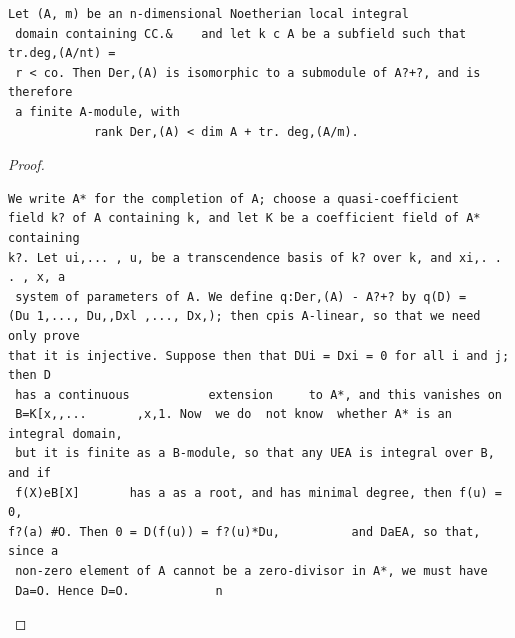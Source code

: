 \begin{theorem}\label{mcrt-auto-theorem-30-7}\uses{}
\begin{verbatim}
Let (A, m) be an n-dimensional Noetherian local integral
 domain containing CC.&    and let k c A be a subfield such that tr.deg,(A/nt) =
 r < co. Then Der,(A) is isomorphic to a submodule of A?+?, and is therefore
 a finite A-module, with
            rank Der,(A) < dim A + tr. deg,(A/m).
\end{verbatim}
\end{theorem}
\begin{proof}
\begin{verbatim}
We write A* for the completion of A; choose a quasi-coefficient
field k? of A containing k, and let K be a coefficient field of A* containing
k?. Let ui,... , u, be a transcendence basis of k? over k, and xi,. . . , x, a
 system of parameters of A. We define q:Der,(A) - A?+? by q(D) =
(Du 1,..., Du,,Dxl ,..., Dx,); then cpis A-linear, so that we need only prove
that it is injective. Suppose then that DUi = Dxi = 0 for all i and j; then D
 has a continuous           extension     to A*, and this vanishes on
 B=K[x,,...       ,x,1. Now  we do  not know  whether A* is an integral domain,
 but it is finite as a B-module, so that any UEA is integral over B, and if
 f(X)eB[X]       has a as a root, and has minimal degree, then f(u) = 0,
f?(a) #O. Then 0 = D(f(u)) = f?(u)*Du,          and DaEA, so that, since a
 non-zero element of A cannot be a zero-divisor in A*, we must have
 Da=O. Hence D=O.            n
\end{verbatim}
\end{proof}


